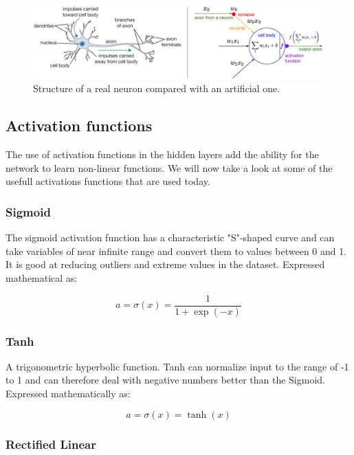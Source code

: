 \begin{figure}[H]
	\centering
	\includegraphics[width=\linewidth]{fig/artificial-neuron.png}
	\caption{Structure of a real neuron compared with an artificial one. \cite{Li}}
	\label{fig:artificial-neuron}
\end{figure}

\subsection{Activation functions}

The use of activation functions in the hidden layers add the ability for the network to learn non-linear functions. We will now take a look at some of the usefull activations functions that are used today.

\subsubsection*{Sigmoid}
The sigmoid activation function has a characteristic "S"-shaped curve and can take variables of near infinite range and convert them to values between 0 and 1. It is good at reducing outliers and extreme values in the dataset. Expressed mathematical as:

\begin{equation}
a = \sigma(x) = \frac{1}{1+\exp(-x)}
\end{equation}


\subsubsection*{Tanh}

A trigonometric hyperbolic function. Tanh can normalize input to the range of -1 to 1 and can therefore deal with negative numbers better than the Sigmoid. Expressed mathematically as:

\begin{equation}
a = \sigma(x) = \tanh(x)
\end{equation}


\subsubsection*{Rectified Linear}

